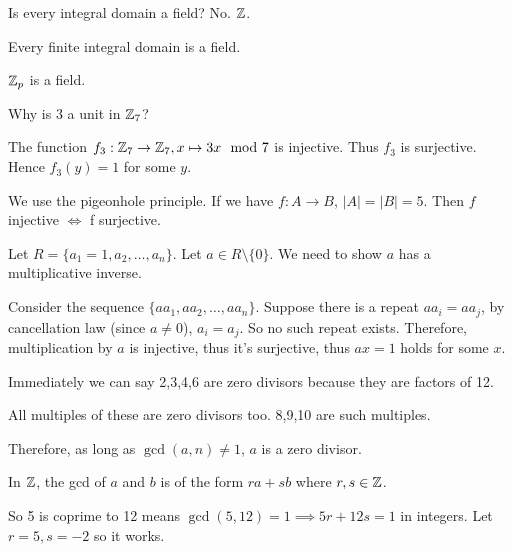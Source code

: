 \documentclass[class=article,crop=false]{standalone}
\begin{document}
Is every integral domain a field? No. $ \mathbb{Z}$.

\begin{thm}[]
	Every finite integral domain is a field.
\end{thm}
\begin{coro}[]
	$ \mathbb{Z}_p$ is a field.
\end{coro}
\begin{intuition}[]
Why is $ 3$ a unit in  $ \mathbb{Z}_7$?

The function $ f_3: \mathbb{Z}_7 \to \mathbb{Z}_7, x\mapsto 3x \mod 7$ is injective. Thus $ f_3$ is surjective. Hence $ f_3(y)=1$ for some $ y$.
\end{intuition}
\begin{prf}
We use the pigeonhole principle. If we have $ f:A \to B$, $ |A|=|B|=5$. Then  $ f$ injective  $ \iff$ f surjective.

Let $ R = \{a_1=1,a_2,\ldots,a_n\} $. Let $ a \in R\setminus \{0\} $. We need to show $ a$ has a multiplicative inverse.

Consider the sequence  $ \{aa_1,aa_2,\ldots,aa_n\} $. Suppose there is a repeat $ a a_i=a a_j$, by cancellation law (since $ a\neq 0$), $ a_i = a_j$. So no such repeat exists. Therefore, multiplication by $ a$ is injective, thus it's surjective, thus  $ ax=1$ holds for some  $ x$. 
\end{prf}
\begin{eg}
Immediately we can say 2,3,4,6 are zero divisors because they are factors of 12.

All multiples of these are zero divisors too. 8,9,10 are such multiples.

Therefore, as long as $ \gcd ( a,n) \neq 1 $, $ a$ is a zero divisor.

\begin{note}[]
In $ \mathbb{Z}$, the gcd of $ a$ and $ b$ is of the form  $ ra+sb$ where  $ r,s \in \mathbb{Z}$.
\end{note}

So 5 is coprime to 12 means $ \gcd ( 5,12)=1 \implies 5r+12s=1$ in integers. Let $ r=5,s=-2$ so it works.
\end{eg}
\end{document}
